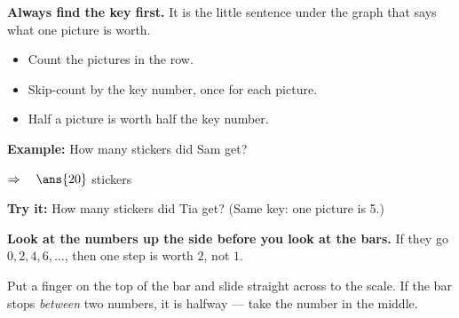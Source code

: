 \documentclass[12pt]{article}
\begin{document}


\begin{formulabox}
\textbf{Always find the key first.} It is the little sentence under the graph that says
what one picture is worth.
\begin{itemize}[label={$\bullet$}, leftmargin=1.0cm, itemsep=0pt, topsep=1pt]
  \item Count the pictures in the row.
  \item Skip-count by the key number, once for each picture.
  \item Half a picture is worth half the key number.
\end{itemize}
\end{formulabox}

\begin{examplebox}
\textbf{Example:} \quad How many stickers did Sam get?
\begin{center}
\end{center}

$\Rightarrow\quad \ans{20}$ stickers
\end{examplebox}

\begin{tryitbox}
\textbf{Try it:} \quad How many stickers did Tia get? (Same key: one picture is 5.)\\[2pt]
\end{tryitbox}


\begin{formulabox}
\textbf{Look at the numbers up the side before you look at the bars.} If they go
$0, 2, 4, 6, \ldots$, then one step is worth $2$, not $1$.\par
\smallskip
Put a finger on the top of the bar and slide straight across to the scale. If the bar
stops \emph{between} two numbers, it is halfway --- take the number in the middle.
\end{formulabox}
\end{document}
